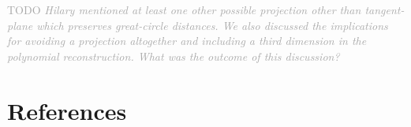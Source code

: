 \documentclass[times]{elsarticle}
\newcommand{\TODO}[1]{\textcolor{darkgray}{TODO \textit{#1}}}
\begin{document}
\TODO{Hilary mentioned at least one other possible projection other than tangent-plane which preserves great-circle distances.  We also discussed the implications for avoiding a projection altogether and including a third dimension in the polynomial reconstruction.  What was the outcome of this discussion?}

\section*{References}


\end{document}
